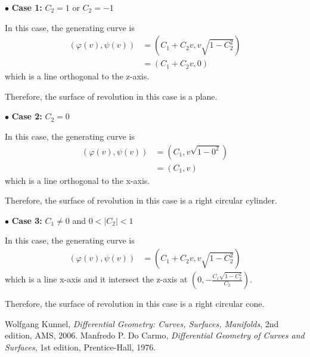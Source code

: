 \documentclass[a4paper]{report}
\begin{document}
$\bullet$ \textbf{Case 1:} $C_2 = 1$ or $C_2 = -1$ 

In this case, the generating curve is
\begin{align}
(\varphi(v),\psi(v)) &= \left(C_1 + C_2 v,v\sqrt{1 - C_2^2}\right)\\
&= \left(C_1 + C_2 v,0\right)
\end{align}
which is a line orthogonal to the z-axis.

Therefore, the surface of revolution in this case is a plane.

$\bullet$ \textbf{Case 2:} $C_2 = 0$

In this case, the generating curve is
\begin{align}
(\varphi(v),\psi(v)) &= \left(C_1,v\sqrt{1 - 0^2}\right)\\
&= \left(C_1,v\right)
\end{align}
which is a line orthogonal to the x-axis.

Therefore, the surface of revolution in this case is a right circular cylinder.

$\bullet$ \textbf{Case 3:} $C_1 \neq 0$ and $0 < \lvert C_2\rvert < 1$ 

In this case, the generating curve is
\begin{align}
(\varphi(v),\psi(v)) &= \left(C_1 + C_2 v,v\sqrt{1 - C_2^2}\right)
\end{align}
which is a line x-axis and it intersect the z-axis at $\left(0, -\frac{C_1\sqrt{1 - C_2^2}}{C_2}\right)$.

Therefore, the surface of revolution in this case is a right circular cone.

\newpage
\printindex
\newpage
\begin{thebibliography}{999}
 Wolfgang Kunnel, \textit{Differential Geometry: Curves, Surfaces, Manifolds}, 2nd edition, AMS, 2006.
 Manfredo P. Do Carmo, \textit{Differential Geometry of Curves and Surfaces}, 1st edition, Prentice-Hall, 1976.
\end{thebibliography}
\end{document}
